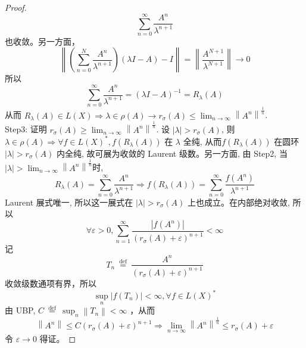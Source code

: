 \documentclass[lang=cn,newtx,10pt,scheme=chinese,thmcnt=chapter]{elegantbook}
\begin{document}
\begin{proof}
\begin{equation*}
\sum_{n=0}^{\infty}\frac{A^n}{\lambda^{n+1}}
\end{equation*}
也收敛。另一方面，
\begin{equation*}
\left\|\left(\sum_{n=0}^N \frac{A^n}{\lambda^{n+1}}\right)(\lambda I-A)-I\right\|=\left\|\frac{A^{N+1}}{\lambda^{N+1}}\right\| \rightarrow 0
\end{equation*}
所以
\begin{equation*}
\sum_{n=0}^{\infty} \frac{A^n}{\lambda^{n+1}}=(\lambda I-A)^{-1}=R_\lambda(A)
\end{equation*}
从而 $R_\lambda(A) \in L (X) \Rightarrow \lambda \in \rho(A) \rightarrow r_\sigma(A) \leqslant \lim _{n \rightarrow \infty}\left\|A^n\right\|^{\frac{1}{n}}$.\\
Step3: 证明 $r_\sigma(A) \geqslant \lim _{n \rightarrow \infty}\left\|A^n\right\|^{\frac{1}{n}}$. 设 $|\lambda|>r_\sigma(A)$, 则 $\lambda \in \rho(A) \Rightarrow \forall f \in L (X)^*, f\left(R_\lambda(A)\right)$ 在 $\lambda$ 全纯, 从而$f\left(R_\lambda(A)\right)$ 在圆环 $|\lambda|>r_\sigma(A)$ 内全纯, 故可展为收敛的 Laurent 级数。另一方面, 由 Step2, 当 $|\lambda|>\lim _{n \rightarrow \infty}\left\|A^n\right\|^{\frac{1}{n}}$时,
\begin{equation*}
R_\lambda(A)=\sum_{n=0}^{\infty} \frac{A^n}{\lambda^{n+1}} \Rightarrow f\left(R_\lambda(A)\right)=\sum_{n=0}^{\infty} \frac{f\left(A^n\right)}{\lambda^{n+1}}
\end{equation*}
Laurent 展式唯一, 所以这一展式在 $|\lambda|>r_\sigma(A)$ 上也成立。在内部绝对收敛, 所以
\begin{equation*}
\forall \varepsilon>0, \sum_{n=1}^{\infty} \frac{\left|f\left(A^n\right)\right|}{\left(r_\sigma(A)+\varepsilon\right)^{n+1}}<\infty
\end{equation*}
记
\begin{equation*}
T_n \stackrel{\text { def }}{=} \frac{A^n}{\left(r_\sigma(A)+\varepsilon\right)^{n+1}}
\end{equation*}
收敛级数通项有界，所以
\begin{equation*}
\sup _n\left|f\left(T_n\right)\right|<\infty, \forall f \in L (X)^*
\end{equation*}
由 UBP, $C \stackrel{\text { def }}{=} \sup _n\left\|T_n\right\|<\infty$ ，从而
\begin{equation*}
\left\|A^n\right\| \leqslant C\left(r_\sigma(A)+\varepsilon\right)^{n+1} \Rightarrow \lim _{n \rightarrow \infty}\left\|A^n\right\|^{\frac{1}{n}} \leqslant r_\sigma(A)+\varepsilon
\end{equation*}
令 $\varepsilon \rightarrow 0$ 得证。
\end{proof}
\end{document}
